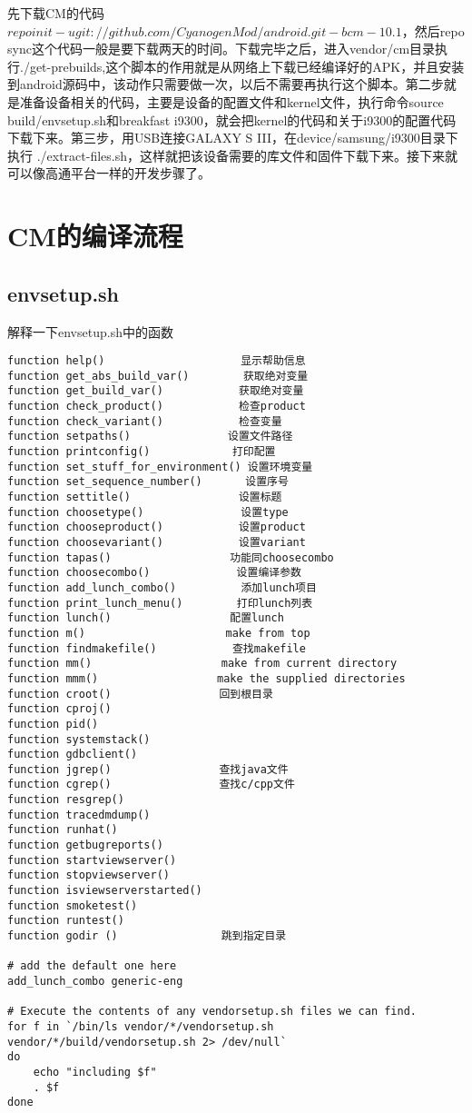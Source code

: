 \documentclass[12pt,a4paper]{article}
\begin{document}
  先下载CM的代码$repo init -u git://github.com/CyanogenMod/android.git -b cm-10.1$，然后repo sync这个代码一般是要下载两天的时间。下载完毕之后，进入vendor/cm目录执行./get-prebuilds,这个脚本的作用就是从网络上下载已经编译好的APK，并且安装到android源码中，该动作只需要做一次，以后不需要再执行这个脚本。第二步就是准备设备相关的代码，主要是设备的配置文件和kernel文件，执行命令source build/envsetup.sh和breakfast i9300，就会把kernel的代码和关于i9300的配置代码下载下来。第三步，用USB连接GALAXY S III，在device/samsung/i9300目录下执行 ./extract-files.sh，这样就把该设备需要的库文件和固件下载下来。接下来就可以像高通平台一样的开发步骤了。
\label{3}



\section{CM的编译流程}

\subsection{envsetup.sh}
解释一下envsetup.sh中的函数 \\
\begin{verbatim}
function help() 　　　　　　　　　　　　显示帮助信息
function get_abs_build_var()　　　　　获取绝对变量
function get_build_var()　　　　　　　获取绝对变量
function check_product()　　　　　　　检查product
function check_variant()　　　　　　　检查变量
function setpaths()　　　　　　　　　设置文件路径
function printconfig()　　　　　　　 打印配置
function set_stuff_for_environment() 设置环境变量
function set_sequence_number()　　　　设置序号
function settitle()　　　　　　　　　　设置标题
function choosetype()　　　　　　　　　设置type
function chooseproduct()　　　　　　　设置product
function choosevariant()　　　　　　　设置variant
function tapas()　　　　　　　　　　　功能同choosecombo
function choosecombo()　　　　　　　　设置编译参数
function add_lunch_combo()　　　　　　添加lunch项目
function print_lunch_menu()　　　　　打印lunch列表
function lunch()　　　　　　　　　　　配置lunch
function m()　　　　　　　　　　　　　make from top
function findmakefile()　　　　　　　查找makefile
function mm()　　　　　　　　　　　　make from current directory
function mmm()　　　　　　　　　　　make the supplied directories
function croot()　　　　　　　　　　回到根目录
function cproj()
function pid()
function systemstack()
function gdbclient()
function jgrep()　　　　　　　　　　查找java文件
function cgrep()　　　　　　　　　　查找c/cpp文件
function resgrep()
function tracedmdump()
function runhat()
function getbugreports()
function startviewserver()
function stopviewserver()
function isviewserverstarted()
function smoketest()
function runtest()
function godir () 　　　　　　　　　跳到指定目录
 
# add the default one here
add_lunch_combo generic-eng
 
# Execute the contents of any vendorsetup.sh files we can find.
for f in `/bin/ls vendor/*/vendorsetup.sh vendor/*/build/vendorsetup.sh 2> /dev/null`
do
    echo "including $f"
    . $f
done
\end{verbatim}
\label{4_1}
\end{document}
